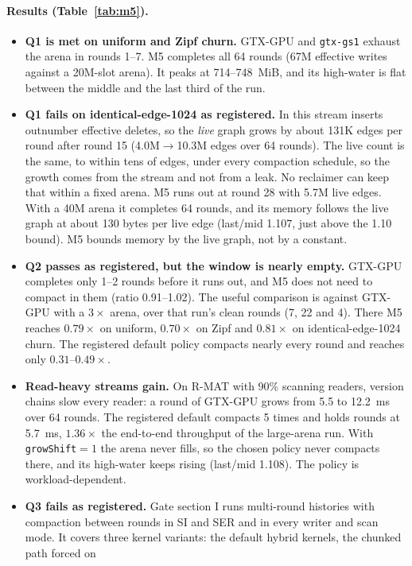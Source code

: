 \documentclass[sigconf,nonacm]{acmart}
\newcommand{\sys}{GTX-GPU}
\newcommand{\code}[1]{\texttt{#1}}
\begin{document}
\paragraph{Results (Table~\ref{tab:m5}).}
\begin{itemize}
\item \textbf{Q1 is met on uniform and Zipf churn.} \sys{} and \code{gtx-gs1} exhaust the arena in rounds 1--7. M5
completes all 64 rounds (67M effective writes against a 20M-slot arena). It peaks at 714--748~MiB, and its
high-water is flat between the middle and the last third of the run.
\item \textbf{Q1 fails on identical-edge-1024 as registered.} In this stream inserts outnumber effective deletes, so
the \emph{live} graph grows by about 131K edges per round after round 15 (4.0M$\to$10.3M edges over 64 rounds). The live count is the same, to within tens of edges, under every compaction schedule, so the growth
comes from the stream and not from a leak. No reclaimer can keep
that within a fixed arena. M5 runs out at round 28 with 5.7M live edges. With a 40M arena it completes 64 rounds, and
its memory follows the live graph at about 130 bytes per live edge (last/mid 1.107, just above the 1.10 bound).
M5 bounds memory by the live graph, not by a constant.
\item \textbf{Q2 passes as registered, but the window is nearly empty.} \sys{} completes only 1--2 rounds before it
runs out, and M5 does not need to compact in them (ratio 0.91--1.02). The useful comparison is against \sys{} with a $3\times$ arena, over
that run's clean rounds (7, 22 and 4). There M5 reaches $0.79\times$ on uniform, $0.70\times$ on Zipf and
$0.81\times$ on identical-edge-1024 churn. The registered default policy compacts nearly every round and reaches only
$0.31$--$0.49\times$.
\item \textbf{Read-heavy streams gain.} On R-MAT with 90\% scanning readers, version chains slow every reader: a
round of \sys{} grows from 5.5 to 12.2~ms over 64 rounds. The registered default compacts 5 times and holds rounds at
5.7~ms, $1.36\times$ the end-to-end throughput of the large-arena run. With \code{growShift}${=}1$ the arena never
fills, so the chosen policy never compacts there, and its high-water keeps rising (last/mid 1.108). The policy is
workload-dependent.
\item \textbf{Q3 fails as registered.} Gate section I runs multi-round histories with compaction between rounds in SI and SER and in
every writer and scan mode. It covers three kernel variants: the default hybrid kernels, the chunked path forced on

\end{itemize}
\end{document}
